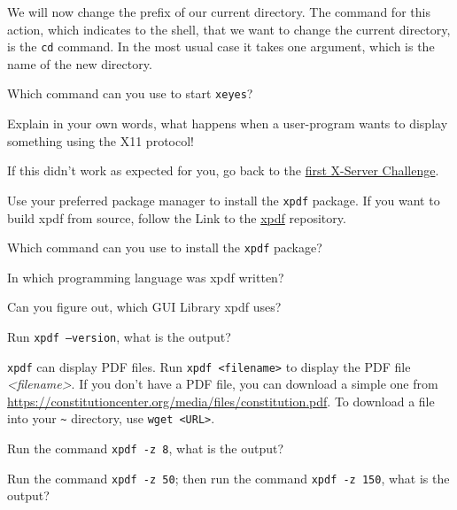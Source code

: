 \begin{challenge}
    \begin{task}
    We will now change the prefix of our current directory.
    The command for this action, which indicates to the shell, that we want to change the current directory, is the \texttt{cd} command.
    In the most usual case it takes one argument, which is the name of the new directory.
        \begin{questions}
            \item Which command can you use to start \texttt{xeyes}?
            \item Explain in your own words, what happens when a user-program wants to display something using the X11 protocol!
        \end{questions}
    If this didn't work as expected for you, go back to the \href{https://www.github.com/STEMgraph/}{first X-Server Challenge}.
    \end{task}
    \begin{task}
    Use your preferred package manager to install the \texttt{xpdf} package. If you want to build xpdf from source, follow the Link to the \href{https://gitlab.com/xpdf-mirror/xpdf}{xpdf} repository.
        \begin{questions}
            \item Which command can you use to install the \texttt{xpdf} package?
            \item In which programming language was xpdf written?
            \item Can you figure out, which GUI Library xpdf uses?
            \item Run \texttt{xpdf --version}, what is the output?
        \end{questions}
    \end{task}
    \begin{task}
    \texttt{xpdf} can display PDF files. Run \texttt{xpdf <filename>} to display the PDF file \textit{<filename>}. If you don't have a PDF file, you can download a simple one from \href{https://constitutioncenter.org/media/files/constitution.pdf}{https://constitutioncenter.org/media/files/constitution.pdf}. To download a file into your \texttt{\textasciitilde} directory, use \texttt{wget <URL>}.
        \begin{questions}
            \item Run the command \texttt{xpdf -z 8}, what is the output?
            \item Run the command \texttt{xpdf -z 50}; then run the command \texttt{xpdf -z 150}, what is the output?

\end{questions}
\end{task}
\end{challenge}
